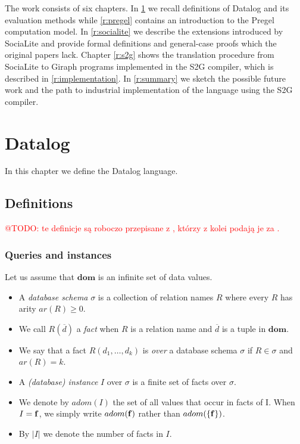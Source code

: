 \documentclass{pracamgr}
\makeatletter
\theoremstyle{plain}
\theoremstyle{definition}
\theoremstyle{remark}
\newcommand{\todo}[1]{\textcolor{red}{@TODO: #1}}
\makeatother
\begin{document}
The work consists of six chapters. In \ref{r:datalog} we recall definitions of Datalog and its evaluation methods while \ref{r:pregel} contains an introduction to the Pregel computation model. In \ref{r:socialite} we describe the extensions introduced by SociaLite and provide formal definitions and general-case proofs which the original papers lack. Chapter \ref{r:s2g} shows the translation procedure from SociaLite to Giraph programs implemented in the S2G compiler, which is described in \ref{r:implementation}. In \ref{r:summary} we sketch the possible future work and the path to industrial implementation of the language using the S2G compiler.

\chapter{Datalog}\label{r:datalog}

In this chapter we define the Datalog language.

\section{Definitions}

\todo{te definicje są roboczo przepisane z \cite{wfom}, którzy z kolei podają je za \cite{fod}.}

\subsection{Queries and instances}

Let us assume that $\bm{dom}$ is an infinite set of
data values.
\begin{itemize}
\item A \emph{database schema} $\sigma$ is a collection of relation names $R$ where every $R$ has arity $ar(R) \ge 0$.
\item We call $R(\overline{d})$ a \emph{fact} when $R$ is a relation name and $\overline{d}$ is a tuple in $\bm{dom}$.
\item We say that a fact $R(d_1 , \dots , d_k)$ is \emph{over} a database schema $\sigma$ if $R \in \sigma$ and $ar (R) = k$.
\item  A \emph{(database) instance} $I$ over $\sigma$ is a finite set of facts over $\sigma$.
\item  We denote by $adom(I)$ the set of all values that occur in facts of I. When $I = {\bf{f}}$, we simply write $adom(\bf{f})$ rather than $adom(\{\bf{f}\})$.
\item By $|I|$ we denote the
number of facts in $I$.
\end{itemize}
\end{document}
